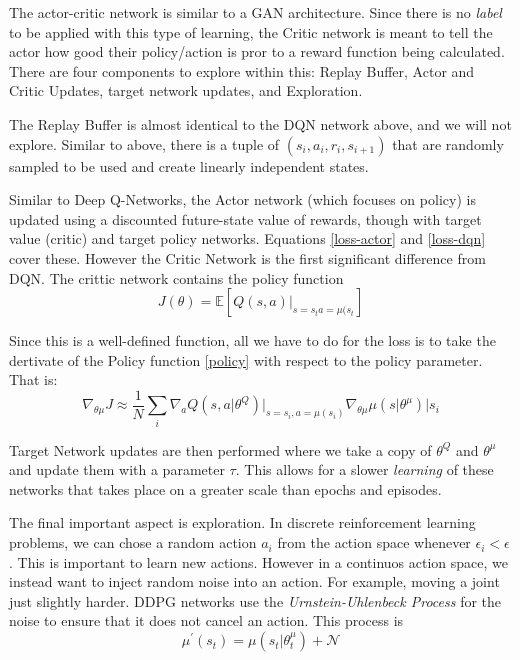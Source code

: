 \documentclass[doc, onecolumn, 12pt]{apa6}
\begin{document}
The actor-critic network is similar to a GAN architecture. Since there is no \emph{label} to be applied with this type of learning, the Critic network is meant to tell the actor how good their policy/action is pror to a reward function being calculated. There are four components to explore within this: Replay Buffer, Actor and Critic Updates, target network updates, and Exploration. 

The Replay Buffer is almost identical to the DQN network above, and we will not explore. Similar to above, there is a tuple of $(s_{i}, a_{i}, r_{i}, s_{i+1})$ that are randomly sampled to be used and create linearly independent states.

Similar to Deep Q-Networks, the Actor network (which focuses on policy) is updated using a discounted future-state value of rewards, though with target value (critic) and target policy networks. Equations \ref{loss-actor} and \ref{loss-dqn} cover these.  However the Critic Network is the first significant difference from DQN. The crittic network contains the policy function \begin{equation} \label{policy} 
J(\theta) = \mathbb{E}  \left[ Q(s,a) \vert_{s=s_{t}a=\mu(s_{t}} \right]
\end{equation} 

Since this is a well-defined function, all we have to do for the loss is to take the dertivate of the Policy function  \ref{policy} with respect to the policy parameter. That is:  \begin{equation} \label{polderiv}  \nabla_{\theta \mu} J \approx \frac{1}{N} \sum_{i} \nabla_{a} Q(s, a \vert \theta^{Q}) \vert_{s=s_{i}, a = \mu (s_{i})}  \nabla_{\theta\mu} \mu(s \vert \theta ^{\mu}) \vert s_{i} \end{equation}

Target Network updates are then performed where we take a copy of $\theta^{Q}$ and $\theta^{\mu}$ and update them with a parameter $\tau$. This allows for a slower \emph{learning} of these networks that takes place on a greater scale than epochs and episodes. 

The final important aspect is exploration. In discrete reinforcement learning problems, we can chose a random action $a_{i}$ from the action space whenever $\epsilon_{i} < \epsilon$. This is important to learn new actions. However in a continuos action space, we instead want to inject random noise into an action. For example, moving a joint just slightly harder. DDPG networks use the \emph{Urnstein-Uhlenbeck Process} for the noise to ensure that it does not cancel an action. This process is \[ \mu ^{\prime}(s_{t}) = \mu( s_{t} \vert \theta^{\mu}_{t}) + \mathcal{N}\]
\end{document}
